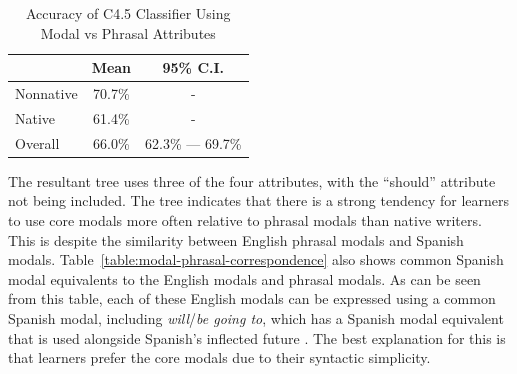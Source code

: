 \documentclass[main.tex]{subfiles}
\begin{document}
\begin{table}[htbp]
\centering
\caption{Accuracy of C4.5 Classifier Using Modal vs Phrasal Attributes}
\begin{tabular}{l c c}
\toprule
& Mean & 95\% C.I.\\
\midrule
Nonnative & 70.7\% & - \\
Native & 61.4\% & - \\
Overall & 66.0\% & 62.3\% --- 69.7\% \\
\bottomrule
\end{tabular}
\label{table:modal-phrasal-results}
\end{table}

The resultant tree uses three of the four attributes, with the ``should'' attribute not being included. The tree indicates that there is a strong tendency for learners to use core modals more often relative to phrasal modals than native writers. This is despite the similarity between English phrasal modals and Spanish modals. Table~\ref{table:modal-phrasal-correspondence} also shows common Spanish modal equivalents to the English modals and phrasal modals. As can be seen from this table, each of these English modals can be expressed using a common Spanish modal, including \textit{will}/\textit{be going to}, which has a Spanish modal equivalent that is used alongside Spanish's inflected future \citep[p. 221]{butt}. The best explanation for this is that learners prefer the core modals due to their syntactic simplicity.
\end{document}
